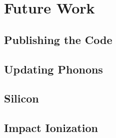 \section{Future Work}\label{future-work}

\subsection{Publishing the Code}\label{publishing-the-code}

\subsection{Updating Phonons}\label{updating-phonons}

\subsection{Silicon}\label{silicon}

\subsection{Impact Ionization}\label{impact-ionization}
